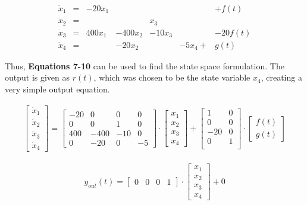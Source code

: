 \documentclass[11pt]{article}
\begin{document}
\begin{align}
\dot{x}_1 &= &-20x_1 & & & &+f(t) \\
\dot{x}_2 &= & & &x_3 & & \\ 
\dot{x}_3 &= &400x_1 &-400x_2 &-10x_3 & &-20f(t) \\
\dot{x}_4 &= & &-20x_2 & &-5x_4 + &g(t)
\end{align}

Thus, \textbf{Equations 7-10} can be used to find the state space formulation. The output is given as $r(t)$, which was chosen to be the state variable $x_4$, creating a very simple output equation.

\begin{gather}
\begin{bmatrix}
\dot{x}_1 \\ \dot{x}_2 \\ \dot{x}_3 \\ \dot{x}_4
\end{bmatrix} =
\begin{bmatrix}
-20 & 0 & 0 & 0 \\
0 & 0 & 1 & 0 \\
400 & -400 & -10 & 0 \\
0 & -20 & 0 & -5
\end{bmatrix} \cdot
\begin{bmatrix}
x_1 \\ x_2 \\ x_3 \\ x_4
\end{bmatrix} + 
\begin{bmatrix}
1 & 0 \\
0 & 0 \\
-20 & 0 \\
0 & 1 \\
\end{bmatrix} \cdot
\begin{bmatrix}
f(t) \\
g(t)
\end{bmatrix}
\end{gather}

\begin{gather}
y_{out}(t)=\begin{bmatrix}
0 & 0 & 0 & 1
\end{bmatrix} \cdot
\begin{bmatrix}
x_1 \\ x_2 \\ x_3 \\ x_4
\end{bmatrix} + 0
\end{gather}
\end{document}

